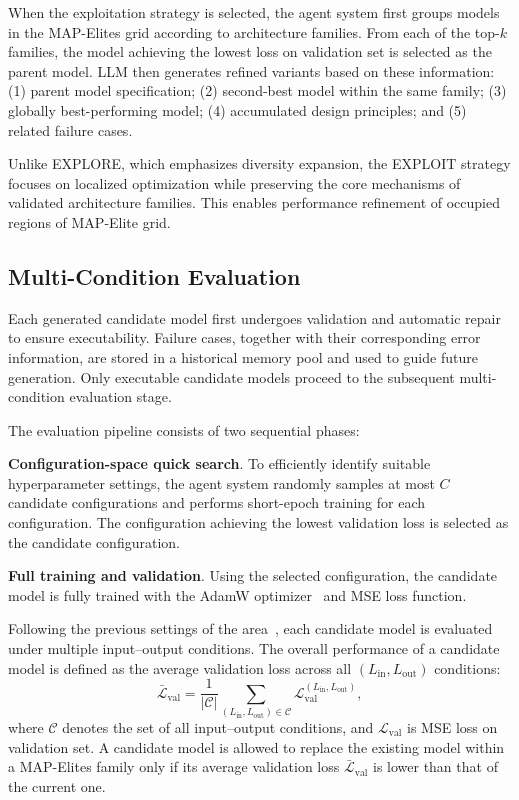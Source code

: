 When the exploitation strategy is selected, the agent system first groups models in the MAP-Elites grid according to architecture families. From each of the top-$k$ families, the model achieving the lowest loss on validation set is selected as the parent model. LLM then generates refined variants based on these information: (1) parent model specification; (2) second-best model within the same family; (3) globally best-performing model; (4) accumulated design principles; and (5) related failure cases.

Unlike EXPLORE, which emphasizes diversity expansion, the EXPLOIT strategy focuses on localized optimization while preserving the core mechanisms of validated architecture families. This enables performance refinement of occupied regions of MAP-Elite grid.

\subsection{Multi-Condition Evaluation}

Each generated candidate model first undergoes validation and automatic repair to ensure executability. Failure cases, together with their corresponding error information, are stored in a historical memory pool and used to guide future generation. Only executable candidate models proceed to the subsequent multi-condition evaluation stage.

The evaluation pipeline consists of two sequential phases:

\textbf{Configuration-space quick search}. To efficiently identify suitable hyperparameter settings, the agent system randomly samples at most $C$ candidate configurations and performs short-epoch training for each configuration. The configuration achieving the lowest validation loss is selected as the candidate configuration.

\textbf{Full training and validation}. Using the selected configuration, the candidate model is fully trained with the AdamW optimizer~\cite{AdamW} and MSE loss function.

Following the previous settings of the area~\cite{TimeMMD}, each candidate model is evaluated under multiple input--output conditions. The overall performance of a candidate model is defined as the average validation loss across all $(L_{\text{in}}, L_{\text{out}})$ conditions:
\begin{equation}
\bar{\mathcal{L}}_{\text{val}} = \frac{1}{|\mathcal{C}|}
\sum_{(L_{\text{in}}, L_{\text{out}})\in\mathcal{C}} \mathcal{L}_{\text{val}}^{(L_{\text{in}}, L_{\text{out}})},
\end{equation}
where $\mathcal{C}$ denotes the set of all input--output conditions, and $\mathcal{L}_{\text{val}}$ is MSE loss on validation set. A candidate model is allowed to replace the existing model within a MAP-Elites family only if its average validation loss $\bar{\mathcal{L}}_{\text{val}}$ is lower than that of the current one.


